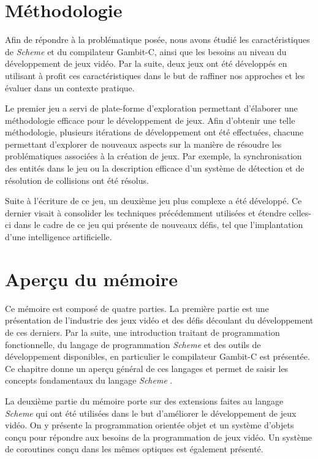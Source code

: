 \documentclass[12pt,twoside,letterpaper,francais]{book}
\newcommand{\Schemelang}{{\textit{Scheme }}}
\begin{document}
\FloatBarrier
\section{Méthodologie}
Afin de répondre à la problématique posée, nous avons étudié les
caractéristiques de \Schemelang et du compilateur Gambit-C, ainsi que
les besoins au niveau du développement de jeux vidéo. Par la suite,
deux jeux ont été développés en utilisant à profit ces
caractéristiques dans le but de raffiner nos approches et les évaluer
dans un contexte pratique.

Le premier jeu a servi de plate-forme d'exploration permettant
d'élaborer une méthodologie efficace pour le développement de
jeux. Afin d'obtenir une telle méthodologie, plusieurs itérations de
développement ont été effectuées, chacune permettant d'explorer de
nouveaux aspects sur la manière de résoudre les problématiques
associées à la création de jeux. Par exemple, la synchronisation des
entités dans le jeu ou la description efficace d'un système de
détection et de résolution de collisions ont été résolus.

Suite à l'écriture de ce jeu, un deuxième jeu plus complexe a été
développé. Ce dernier visait à consolider les techniques précédemment
utilisées et étendre celles-ci dans le cadre de ce jeu qui présente de
nouveaux défis, tel que l'implantation d'une intelligence
artificielle.


\FloatBarrier
\section{Aperçu du mémoire}
Ce mémoire est composé de quatre parties. La première partie est une
présentation de l'industrie des jeux vidéo et des défis découlant du
développement de ces derniers. Par la suite, une introduction traitant
de programmation fonctionnelle, du langage de programmation
\Schemelang et des outils de développement disponibles, en particulier
le compilateur Gambit-C est présentée. Ce chapitre donne un aperçu
général de ces langages et permet de saisir les concepts fondamentaux
du langage \Schemelang.

La deuxième partie du mémoire porte sur des extensions faites au
langage \Schemelang qui ont été utilisées dans le but d'améliorer le
développement de jeux vidéo. On y présente la programmation orientée
objet et un système d'objets conçu pour répondre aux besoins de la
programmation de jeux vidéo. Un système de coroutines conçu dans les
mêmes optiques est également présenté.
\end{document}
